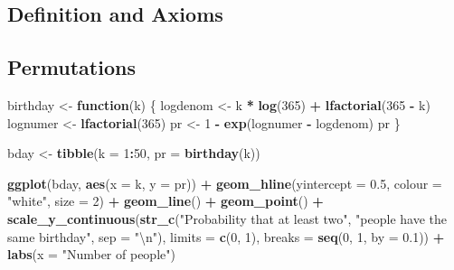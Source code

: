 \documentclass[]{book}
\newenvironment{Shaded}{\begin{snugshade}}{\end{snugshade}}
\newcommand{\KeywordTok}[1]{\textcolor[rgb]{0.13,0.29,0.53}{\textbf{#1}}}
\newcommand{\DataTypeTok}[1]{\textcolor[rgb]{0.13,0.29,0.53}{#1}}
\newcommand{\DecValTok}[1]{\textcolor[rgb]{0.00,0.00,0.81}{#1}}
\newcommand{\FloatTok}[1]{\textcolor[rgb]{0.00,0.00,0.81}{#1}}
\newcommand{\CharTok}[1]{\textcolor[rgb]{0.31,0.60,0.02}{#1}}
\newcommand{\StringTok}[1]{\textcolor[rgb]{0.31,0.60,0.02}{#1}}
\newcommand{\ControlFlowTok}[1]{\textcolor[rgb]{0.13,0.29,0.53}{\textbf{#1}}}
\newcommand{\OperatorTok}[1]{\textcolor[rgb]{0.81,0.36,0.00}{\textbf{#1}}}
\newcommand{\NormalTok}[1]{#1}
\theoremstyle{definition}
\theoremstyle{definition}
\theoremstyle{definition}
\theoremstyle{remark}
\begin{document}
\subsection{Definition and Axioms}\label{definition-and-axioms}

\subsection{Permutations}\label{permutations}

\begin{Shaded}
\begin{Highlighting}[]
\NormalTok{birthday <-}\StringTok{ }\ControlFlowTok{function}\NormalTok{(k) \{}
\NormalTok{  logdenom <-}\StringTok{ }\NormalTok{k }\OperatorTok{*}\StringTok{ }\KeywordTok{log}\NormalTok{(}\DecValTok{365}\NormalTok{) }\OperatorTok{+}\StringTok{ }\KeywordTok{lfactorial}\NormalTok{(}\DecValTok{365} \OperatorTok{-}\StringTok{ }\NormalTok{k)}
\NormalTok{  lognumer <-}\StringTok{ }\KeywordTok{lfactorial}\NormalTok{(}\DecValTok{365}\NormalTok{)}
\NormalTok{  pr <-}\StringTok{ }\DecValTok{1} \OperatorTok{-}\StringTok{   }\KeywordTok{exp}\NormalTok{(lognumer }\OperatorTok{-}\StringTok{ }\NormalTok{logdenom)}
\NormalTok{  pr}
\NormalTok{\}}

\NormalTok{bday <-}\StringTok{ }\KeywordTok{tibble}\NormalTok{(}\DataTypeTok{k =} \DecValTok{1}\OperatorTok{:}\DecValTok{50}\NormalTok{, }\DataTypeTok{pr =} \KeywordTok{birthday}\NormalTok{(k))}

\KeywordTok{ggplot}\NormalTok{(bday, }\KeywordTok{aes}\NormalTok{(}\DataTypeTok{x =}\NormalTok{ k, }\DataTypeTok{y =}\NormalTok{ pr)) }\OperatorTok{+}
\StringTok{  }\KeywordTok{geom_hline}\NormalTok{(}\DataTypeTok{yintercept =} \FloatTok{0.5}\NormalTok{, }\DataTypeTok{colour =} \StringTok{"white"}\NormalTok{, }\DataTypeTok{size =} \DecValTok{2}\NormalTok{) }\OperatorTok{+}
\StringTok{  }\KeywordTok{geom_line}\NormalTok{() }\OperatorTok{+}
\StringTok{  }\KeywordTok{geom_point}\NormalTok{() }\OperatorTok{+}
\StringTok{  }\KeywordTok{scale_y_continuous}\NormalTok{(}\KeywordTok{str_c}\NormalTok{(}\StringTok{"Probability that at least two"}\NormalTok{,}
                           \StringTok{"people have the same birthday"}\NormalTok{, }\DataTypeTok{sep =} \StringTok{"}\CharTok{\textbackslash{}n}\StringTok{"}\NormalTok{),}
                     \DataTypeTok{limits =} \KeywordTok{c}\NormalTok{(}\DecValTok{0}\NormalTok{, }\DecValTok{1}\NormalTok{), }\DataTypeTok{breaks =} \KeywordTok{seq}\NormalTok{(}\DecValTok{0}\NormalTok{, }\DecValTok{1}\NormalTok{, }\DataTypeTok{by =} \FloatTok{0.1}\NormalTok{)) }\OperatorTok{+}
\StringTok{  }\KeywordTok{labs}\NormalTok{(}\DataTypeTok{x =} \StringTok{"Number of people"}\NormalTok{)}
\end{Highlighting}
\end{Shaded}
\end{document}
